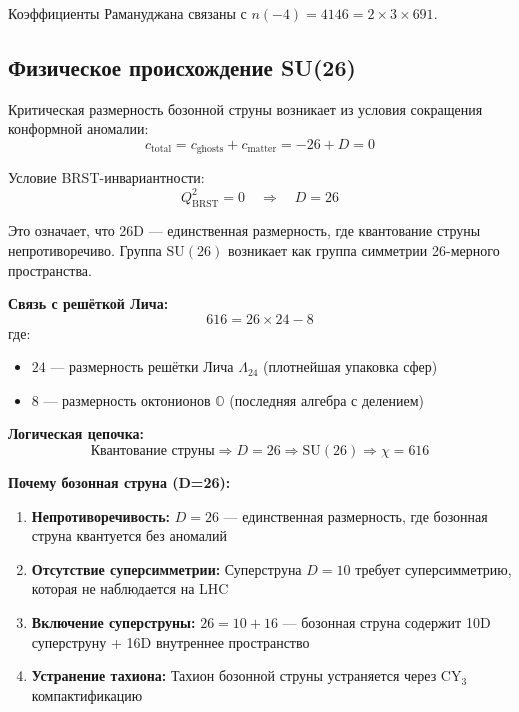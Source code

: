 \documentclass[12pt,a4paper,twoside]{article}
\newcommand{\SU}{\mathrm{SU}}
\theoremstyle{definition}
\begin{document}
Коэффициенты Рамануджана связаны с $n(-4) = 4146 = 2 \times 3 \times 691$.

\subsection{Физическое происхождение SU(26)}
\label{sec:origin_su26}

Критическая размерность бозонной струны возникает из условия сокращения конформной аномалии:
\begin{equation}
c_{\text{total}} = c_{\text{ghosts}} + c_{\text{matter}} = -26 + D = 0
\label{eq:critical_dim}
\end{equation}

Условие BRST-инвариантности:
\begin{equation}
Q_{\text{BRST}}^2 = 0 \quad \Rightarrow \quad D = 26
\label{eq:brst}
\end{equation}

Это означает, что 26D — единственная размерность, где квантование струны непротиворечиво. Группа $\SU(26)$ возникает как группа симметрии 26-мерного пространства.

\textbf{Связь с решёткой Лича:}
\begin{equation}
616 = 26 \times 24 - 8
\label{eq:leech}
\end{equation}
где:
\begin{itemize}
    \item $24$ — размерность решётки Лича $\Lambda_{24}$ (плотнейшая упаковка сфер)
    \item $8$ — размерность октонионов $\mathbb{O}$ (последняя алгебра с делением)
\end{itemize}

\textbf{Логическая цепочка:}
\begin{equation}
\boxed{
\text{Квантование струны} \Rightarrow D=26 \Rightarrow \SU(26) \Rightarrow \chi=616
}
\end{equation}

\textbf{Почему бозонная струна (D=26):}
\begin{enumerate}
    \item \textbf{Непротиворечивость:} $D=26$ — единственная размерность, где бозонная струна квантуется без аномалий
    \item \textbf{Отсутствие суперсимметрии:} Суперструна $D=10$ требует суперсимметрию, которая не наблюдается на LHC
    \item \textbf{Включение суперструны:} $26 = 10 + 16$ — бозонная струна содержит 10D суперструну + 16D внутреннее пространство
    \item \textbf{Устранение тахиона:} Тахион бозонной струны устраняется через CY$_3$ компактификацию
\end{enumerate}
\end{document}
